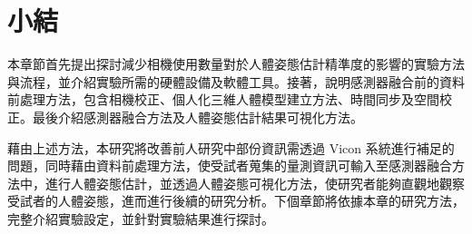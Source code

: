 \section{小結}
本章節首先提出探討減少相機使用數量對於人體姿態估計精準度的影響的實驗方法與流程，並介紹實驗所需的硬體設備及軟體工具。接著，說明感測器融合前的資料前處理方法，包含相機校正、個人化三維人體模型建立方法、時間同步及空間校正。最後介紹感測器融合方法及人體姿態估計結果可視化方法。

藉由上述方法，本研究將改善前人研究中部份資訊需透過 Vicon 系統進行補足的問題，同時藉由資料前處理方法，使受試者蒐集的量測資訊可輸入至感測器融合方法中，進行人體姿態估計，並透過人體姿態可視化方法，使研究者能夠直觀地觀察受試者的人體姿態，進而進行後續的研究分析。下個章節將依據本章的研究方法，完整介紹實驗設定，並針對實驗結果進行探討。
\clearpage